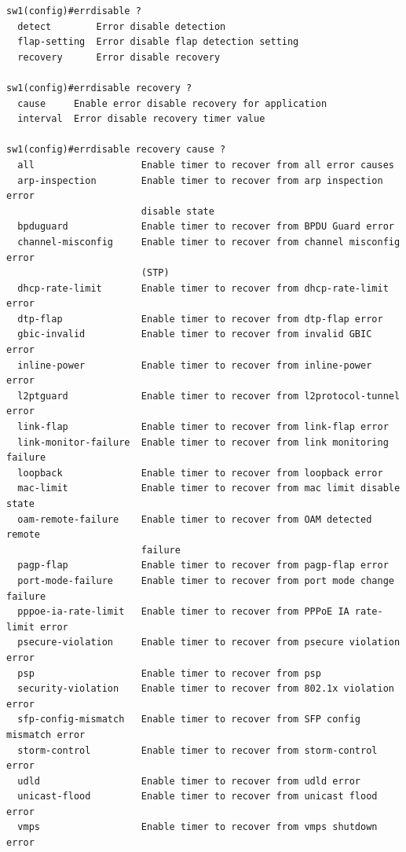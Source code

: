 \vspace{-15pt}
\begin{verbatim}
sw1(config)#errdisable ?
  detect        Error disable detection
  flap-setting  Error disable flap detection setting
  recovery      Error disable recovery

sw1(config)#errdisable recovery ?
  cause     Enable error disable recovery for application
  interval  Error disable recovery timer value

sw1(config)#errdisable recovery cause ?
  all                   Enable timer to recover from all error causes
  arp-inspection        Enable timer to recover from arp inspection error
                        disable state
  bpduguard             Enable timer to recover from BPDU Guard error
  channel-misconfig     Enable timer to recover from channel misconfig error
                        (STP)
  dhcp-rate-limit       Enable timer to recover from dhcp-rate-limit error
  dtp-flap              Enable timer to recover from dtp-flap error
  gbic-invalid          Enable timer to recover from invalid GBIC error
  inline-power          Enable timer to recover from inline-power error
  l2ptguard             Enable timer to recover from l2protocol-tunnel error
  link-flap             Enable timer to recover from link-flap error
  link-monitor-failure  Enable timer to recover from link monitoring failure
  loopback              Enable timer to recover from loopback error
  mac-limit             Enable timer to recover from mac limit disable state
  oam-remote-failure    Enable timer to recover from OAM detected remote
                        failure
  pagp-flap             Enable timer to recover from pagp-flap error
  port-mode-failure     Enable timer to recover from port mode change failure
  pppoe-ia-rate-limit   Enable timer to recover from PPPoE IA rate-limit error
  psecure-violation     Enable timer to recover from psecure violation error
  psp                   Enable timer to recover from psp
  security-violation    Enable timer to recover from 802.1x violation error
  sfp-config-mismatch   Enable timer to recover from SFP config mismatch error
  storm-control         Enable timer to recover from storm-control error
  udld                  Enable timer to recover from udld error
  unicast-flood         Enable timer to recover from unicast flood error
  vmps                  Enable timer to recover from vmps shutdown error
\end{verbatim}
\vspace{-10pt}

